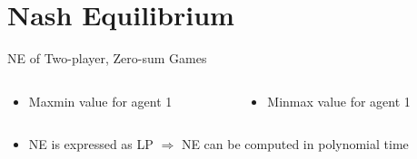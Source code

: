 \documentclass[11pt,aspectratio=169]{beamer}
\begin{document}
 \section{Nash Equilibrium}
  \begin{frame}{NE of Two-player, Zero-sum Games}
   \begin{columns}
   \hspace{0.5em}
    \begin{column}{0.49\textwidth}
     \begin{itemize}
      \item<1-> Maxmin value for agent 1
      \vspace{0.5em}
     \end{itemize}     
    \end{column}
    \begin{column}{0.49\textwidth}
     \begin{itemize}
      \item<3-> Minmax value for agent 1
      \vspace{0.5em}
     \end{itemize}
    \end{column}
   \end{columns}
   \begin{itemize}
    \item<5-> NE is expressed as \alert{LP} $\Rightarrow$ NE can be computed in \alert{polynomial time}
   \end{itemize}
  \end{frame}
  
\end{document}
